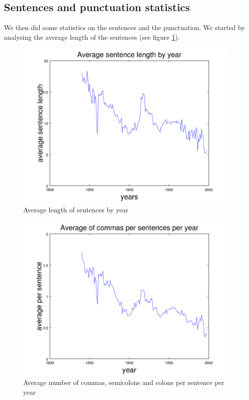 \subsection{Sentences and punctuation statistics}

We then did some statistics on the sentences and the punctuation. We started by analysing the average length of the sentences (see figure  \ref{average_sent_length_figure}).

\begin{figure}[H]
	\centering
    \includegraphics[scale=0.5]{Pictures/statistics/sentences-length/means.png}
    \caption{Average length of sentences by year}
    \label{average_sent_length_figure}\hfill
\end{figure}

\begin{figure}[H]
	\centering
    \includegraphics[scale=0.5]{Pictures/statistics/punctuation/graph.png}
    \caption{Average number of commas, semicolons and colons per sentence per year}
    \label{average_punct}\hfill
\end{figure}

